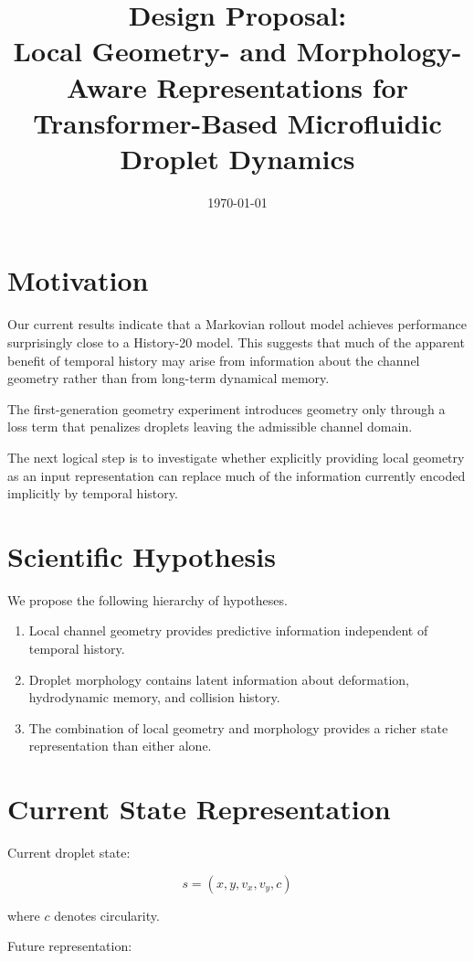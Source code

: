 \documentclass[11pt]{article}
\title{Design Proposal:\\
Local Geometry- and Morphology-Aware Representations for
Transformer-Based Microfluidic Droplet Dynamics}
\author{}
\date{\today}
\begin{document}
\maketitle

\section{Motivation}

Our current results indicate that a Markovian rollout model achieves performance surprisingly close to a History-20 model.
This suggests that much of the apparent benefit of temporal history may arise from information about the channel geometry rather than from long-term dynamical memory.

The first-generation geometry experiment introduces geometry only through a loss term that penalizes droplets leaving the admissible channel domain.

The next logical step is to investigate whether explicitly providing local geometry as an input representation can replace much of the information currently encoded implicitly by temporal history.

\section{Scientific Hypothesis}

We propose the following hierarchy of hypotheses.

\begin{enumerate}[label=\textbf{H\arabic*.}]
\item Local channel geometry provides predictive information independent of temporal history.
\item Droplet morphology contains latent information about deformation, hydrodynamic memory, and collision history.
\item The combination of local geometry and morphology provides a richer state representation than either alone.
\end{enumerate}

\section{Current State Representation}

Current droplet state:

\[
s=(x,y,v_x,v_y,c)
\]

where $c$ denotes circularity.

Future representation:
\end{document}

